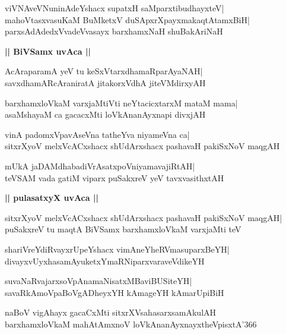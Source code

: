 \documentclass[twoside,12pt,openright]{book}
\newcounter{shloka}[chapter]
\def\uvaca#1{\centerline{{\large\textbf{#1}}}}
\begin{document}
\begin{shloka}%
viVNAveVNuninAdeYshacx supatxH saMparxtibudhayxteV|\\
mahoVtasxvasuKaM BuMketxV duSApxrXpayxmakaqtAtamxBiH|\\
parxsAdAdedxVvadeVvasayx barxhamxNaH shuBakAriNaH
\end{shloka}

\uvaca{|| BiVSamx uvAca ||}
\begin{shloka}%
AcAraparamA yeV tu keSxVtarxdhamaRparAyaNAH|\\
savxdhamARcAraniratA jitakorxVdhA jiteVMdirxyAH
\end{shloka}

\begin{shloka}%
barxhamxloVkaM varxjaMtiVti neYtacicxtarxM mataM mama|\\
asaMshayaM ca gacacxMti loVkAnanAyxnapi divxjAH
\end{shloka}

\begin{shloka}%
vinA padomxVpavAseVna tatheYva niyameVna ca|\\
sitxrXyoV melxVcACxshacx shUdArxshacx pashavaH pakiSxNoV maqgAH
\end{shloka}

\begin{shloka}%
mUkA jaDAMdhabadiVrAsatxpoVniyamavajiRtAH|\\
teVSAM vada gatiM viparx puSakxreV yeV tavxvasithxtAH
\end{shloka}

\uvaca{|| pulasatxyX uvAca ||}
\begin{shloka}%
sitxrXyoV melxVcACxshacx shUdArxshacx pashavaH pakiSxNoV maqgAH|\\
puSakxreV tu maqtA BiVSamx barxhamxloVkaM varxjaMti teV
\end{shloka}

\begin{shloka}%
shariVreYdiRvayxrUpeYshacx vimAneYheRVmasuparxBeYH|\\
divayxvUyxhasamAyuketxYmaRNiparxvaraveVdikeYH
\end{shloka}

\begin{shloka}%
suvaNaRvajarxsoVpAnamaNisatxMBaviBUSiteYH|\\
savaRkAmoVpaBoVgADheyxYH kAmageYH kAmarUpiBiH
\end{shloka}

\begin{shloka}%
naBoV vigAhayx gacaCxMti sitxrXVsahasarxsamAkulAH\\
barxhamxloVkaM mahAtAmxnoV loVkAnanAyxnayxtheVpisxtA\char'366
\end{shloka}
\end{document}
